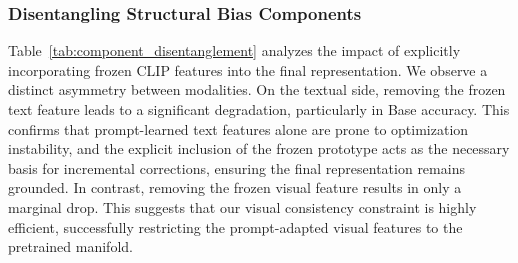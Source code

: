 \documentclass{article}
\theoremstyle{plain}
\theoremstyle{definition}
\theoremstyle{remark}
\begin{document}
	\subsubsection{Disentangling Structural Bias Components}
	\begin{table}[h]
		\caption{Ablation study on the components of the structural bias.}
		\label{tab:component_disentanglement}
		\centering
	\end{table}
	Table~\ref{tab:component_disentanglement} analyzes the impact of explicitly incorporating frozen CLIP features into the final representation. We observe a distinct asymmetry between modalities. On the textual side, removing the frozen text feature leads to a significant degradation, particularly in Base accuracy. This confirms that prompt-learned text features alone are prone to optimization instability, and the explicit inclusion of the frozen prototype acts as the necessary basis for incremental corrections, ensuring the final representation remains grounded. In contrast, removing the frozen visual feature results in only a marginal drop. This suggests that our visual consistency constraint is highly efficient, successfully restricting the prompt-adapted visual features to the pretrained manifold.
\end{document}

